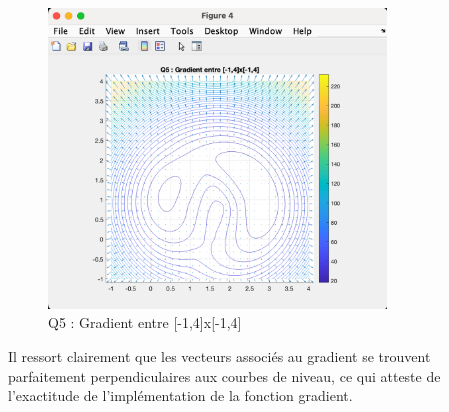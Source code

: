 \documentclass[12pt]{article}
\begin{document}
\begin{figure}[H]
    \centering
    \includegraphics[width=0.8\textwidth]{Q5.png} 
    \caption{Q5 : Gradient entre [-1,4]x[-1,4]}
\end{figure}
Il ressort clairement que les vecteurs associés au gradient se trouvent parfaitement perpendiculaires aux courbes de niveau, ce qui atteste de l’exactitude de l’implémentation de la fonction gradient.
\end{document}
